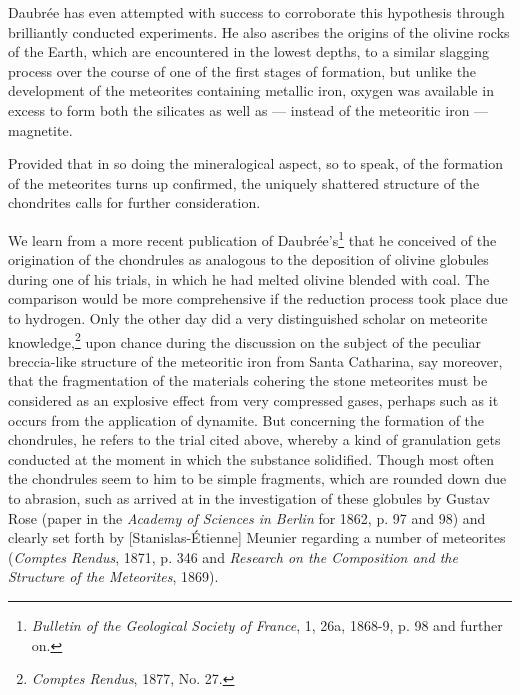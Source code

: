 \documentclass[a4paper, 12pt, oneside]{article}
\begin{document}
Daubrée has even attempted with success to corroborate this hypothesis through brilliantly conducted experiments. He also ascribes the origins of the olivine rocks of the Earth, which are encountered in the lowest depths, to a similar slagging process over the course of one of the first stages of formation, but unlike the development of the meteorites containing metallic iron, oxygen was available in excess to form both the silicates as well as --- instead of the meteoritic iron --- magnetite.

Provided that in so doing the mineralogical aspect, so to speak, of the formation of the meteorites turns up confirmed, the uniquely shattered structure of the chondrites calls for further consideration.

We learn from a more recent publication of Daubrée's\footnote{\emph{Bulletin of the Geological Society of France}, 1, 26a, 1868-9, p. 98 and further on.} that he conceived of the origination of the chondrules as analogous to the deposition of olivine globules during one of his trials, in which he had melted olivine blended with coal. The comparison would be more comprehensive if the reduction process took place due to hydrogen. Only the other day did a very distinguished scholar on meteorite knowledge,\footnote{\emph{Comptes Rendus}, 1877, No. 27.} upon chance during the discussion on the subject of the peculiar breccia-like structure of the meteoritic iron from Santa Catharina, say moreover, that the fragmentation of the materials cohering the stone meteorites must be considered as an explosive effect from very compressed gases, perhaps such as it occurs from the application of dynamite. But concerning the formation of the chondrules, he refers to the trial cited above, whereby a kind of granulation gets conducted at the moment in which the substance solidified. Though most often the chondrules seem to him to be simple fragments, which are rounded down due to abrasion, such as arrived at in the investigation of these globules by Gustav Rose (paper in the \emph{Academy of Sciences in Berlin} for 1862, p. 97 and 98) and clearly set forth by [Stanislas-Étienne] Meunier regarding a number of meteorites (\emph{Comptes Rendus}, 1871, p. 346 and \emph{Research on the Composition and the Structure of the Meteorites}, 1869).
\end{document}
